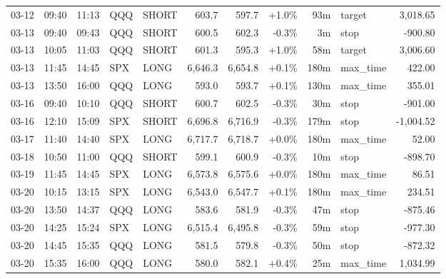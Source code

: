 \documentclass[11pt,a4paper,twoside]{article}
\begin{document}
\begin{center}
\begin{longtable}{>{\color{txtmain}}l l l l l r r r r >{\color{txtmain}}l r}
03-12 & 09:40 & 11:13 & QQQ & SHORT & 603.7 & 597.7 & \textcolor{wingreen}{+1.0\%} & 93m & target & \textcolor{wingreen}{3,018.65} \\
03-13 & 09:40 & 09:43 & QQQ & SHORT & 600.5 & 602.3 & \textcolor{lossred}{-0.3\%} & 3m & stop & \textcolor{lossred}{-900.80} \\
03-13 & 10:05 & 11:03 & QQQ & SHORT & 601.3 & 595.3 & \textcolor{wingreen}{+1.0\%} & 58m & target & \textcolor{wingreen}{3,006.60} \\
03-13 & 11:45 & 14:45 & SPX & LONG & 6,646.3 & 6,654.8 & \textcolor{wingreen}{+0.1\%} & 180m & max\_time & \textcolor{wingreen}{422.00} \\
03-13 & 13:50 & 16:00 & QQQ & LONG & 593.0 & 593.7 & \textcolor{wingreen}{+0.1\%} & 130m & max\_time & \textcolor{wingreen}{355.01} \\
03-16 & 09:40 & 10:10 & QQQ & SHORT & 600.7 & 602.5 & \textcolor{lossred}{-0.3\%} & 30m & stop & \textcolor{lossred}{-901.00} \\
03-16 & 12:10 & 15:09 & SPX & SHORT & 6,696.8 & 6,716.9 & \textcolor{lossred}{-0.3\%} & 179m & stop & \textcolor{lossred}{-1,004.52} \\
03-17 & 11:40 & 14:40 & SPX & LONG & 6,717.7 & 6,718.7 & \textcolor{wingreen}{+0.0\%} & 180m & max\_time & \textcolor{wingreen}{52.00} \\
03-18 & 10:50 & 11:00 & QQQ & SHORT & 599.1 & 600.9 & \textcolor{lossred}{-0.3\%} & 10m & stop & \textcolor{lossred}{-898.70} \\
03-19 & 11:45 & 14:45 & SPX & LONG & 6,573.8 & 6,575.6 & \textcolor{wingreen}{+0.0\%} & 180m & max\_time & \textcolor{wingreen}{86.51} \\
03-20 & 10:15 & 13:15 & SPX & LONG & 6,543.0 & 6,547.7 & \textcolor{wingreen}{+0.1\%} & 180m & max\_time & \textcolor{wingreen}{234.51} \\
03-20 & 13:50 & 14:37 & QQQ & LONG & 583.6 & 581.9 & \textcolor{lossred}{-0.3\%} & 47m & stop & \textcolor{lossred}{-875.46} \\
03-20 & 14:25 & 15:24 & SPX & LONG & 6,515.4 & 6,495.8 & \textcolor{lossred}{-0.3\%} & 59m & stop & \textcolor{lossred}{-977.30} \\
03-20 & 14:45 & 15:35 & QQQ & LONG & 581.5 & 579.8 & \textcolor{lossred}{-0.3\%} & 50m & stop & \textcolor{lossred}{-872.32} \\
03-20 & 15:35 & 16:00 & QQQ & LONG & 580.0 & 582.1 & \textcolor{wingreen}{+0.4\%} & 25m & max\_time & \textcolor{wingreen}{1,034.99} \\
\end{longtable}
\end{center}
\clearpage
\end{document}
